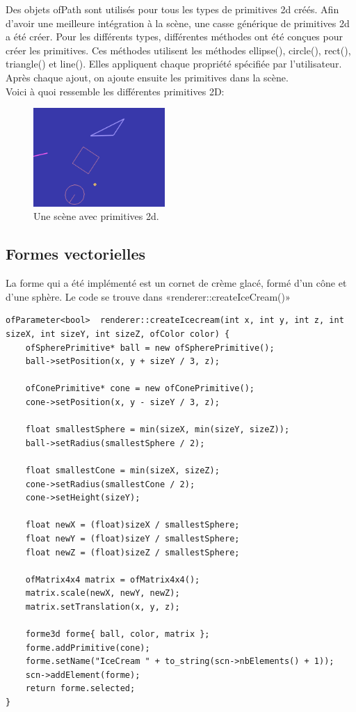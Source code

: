 Des objets ofPath sont utilisés pour tous les types de primitives 2d créés. Afin d’avoir une meilleure intégration à la scène, une casse générique de primitives 2d a été créer. Pour les différents types, différentes méthodes ont été conçues pour créer les primitives. Ces méthodes utilisent les méthodes ellipse(), circle(), rect(), triangle() et line(). Elles appliquent chaque propriété spécifiée par l’utilisateur. Après chaque ajout, on ajoute ensuite les primitives dans la scène.\\

Voici à quoi ressemble les différentes primitives 2D:\\
\begin{figure}[h]
	\centering
	\includegraphics[width=5cm]{fig/primitives2d.png}
	\caption{Une scène avec primitives 2d.}
	\label{fig:prim2d}
\end{figure}

\subsection{Formes vectorielles}
La forme qui a été implémenté est un cornet de crème glacé, formé d'un cône et d'une sphère. Le code se trouve dans «renderer::createIceCream()» 

\begin{lstlisting}
ofParameter<bool>  renderer::createIcecream(int x, int y, int z, int sizeX, int sizeY, int sizeZ, ofColor color) {
	ofSpherePrimitive* ball = new ofSpherePrimitive();
	ball->setPosition(x, y + sizeY / 3, z);
	
	ofConePrimitive* cone = new ofConePrimitive();
	cone->setPosition(x, y - sizeY / 3, z);
	
	float smallestSphere = min(sizeX, min(sizeY, sizeZ));
	ball->setRadius(smallestSphere / 2);
	
	float smallestCone = min(sizeX, sizeZ);
	cone->setRadius(smallestCone / 2);
	cone->setHeight(sizeY);
	
	float newX = (float)sizeX / smallestSphere;
	float newY = (float)sizeY / smallestSphere;
	float newZ = (float)sizeZ / smallestSphere;
	
	ofMatrix4x4 matrix = ofMatrix4x4();
	matrix.scale(newX, newY, newZ);
	matrix.setTranslation(x, y, z);
	
	forme3d forme{ ball, color, matrix };
	forme.addPrimitive(cone);
	forme.setName("IceCream " + to_string(scn->nbElements() + 1));
	scn->addElement(forme);
	return forme.selected;
}
\end{lstlisting}


